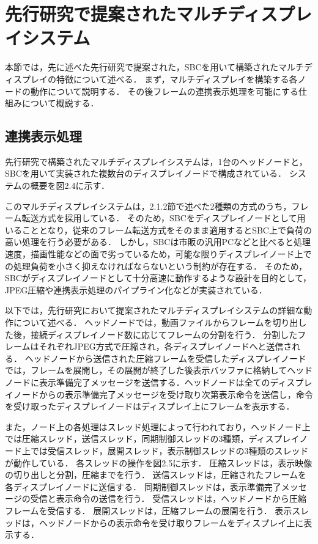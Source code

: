 \documentclass[12pt,a4paper]{jbook}
\begin{document}
\section{先行研究で提案されたマルチディスプレイシステム}

本節では，先に述べた先行研究で提案された，SBCを用いて構築されたマルチディスプレイの特徴について述べる．
まず，マルチディスプレイを構築する各ノードの動作について説明する．
その後フレームの連携表示処理を可能にする仕組みについて概説する．

\subsection{連携表示処理}

先行研究で構築されたマルチディスプレイシステムは，1台のヘッドノードと，SBCを用いて実装された複数台のディスプレイノードで構成されている．
システムの概要を図2.4に示す．

このマルチディスプレイシステムは，2.1.2節で述べた2種類の方式のうち，フレーム転送方式を採用している．
そのため，SBCをディスプレイノードとして用いることとなり，従来のフレーム転送方式をそのまま適用するとSBC上で負荷の高い処理を行う必要がある．
しかし，SBCは市販の汎用PCなどと比べると処理速度，描画性能などの面で劣っているため，可能な限りディスプレイノード上での処理負荷を小さく抑えなければならないという制約が存在する．
そのため，SBCがディスプレイノードとして十分高速に動作するような設計を目的として，JPEG圧縮や連携表示処理のパイプライン化などが実装されている．

以下では，先行研究において提案されたマルチディスプレイシステムの詳細な動作について述べる．
ヘッドノードでは，動画ファイルからフレームを切り出した後，接続ディスプレイノード数に応じてフレームの分割を行う．
分割したフレームはそれぞれJPEG方式で圧縮され，各ディスプレイノードへと送信される．
ヘッドノードから送信された圧縮フレームを受信したディスプレイノードでは，フレームを展開し，その展開が終了した後表示バッファに格納してヘッドノードに表示準備完了メッセージを送信する．ヘッドノードは全てのディスプレイノードからの表示準備完了メッセージを受け取り次第表示命令を送信し，命令を受け取ったディスプレイノードはディスプレイ上にフレームを表示する．

また，ノード上の各処理はスレッド処理によって行われており，ヘッドノード上では圧縮スレッド，送信スレッド，同期制御スレッドの3種類，ディスプレイノード上では受信スレッド，展開スレッド，表示制御スレッドの3種類のスレッドが動作している．
各スレッドの操作を図2.5に示す．
圧縮スレッドは，表示映像の切り出しと分割，圧縮までを行う．
送信スレッドは，圧縮されたフレームを各ディスプレイノードに送信する．
同期制御スレッドは，表示準備完了メッセージの受信と表示命令の送信を行う．
受信スレッドは，ヘッドノードから圧縮フレームを受信する．
展開スレッドは，圧縮フレームの展開を行う．
表示スレッドは，ヘッドノードからの表示命令を受け取りフレームをディスプレイ上に表示する．
   
\end{document}
